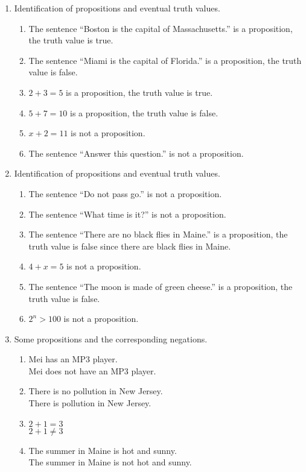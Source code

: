 \documentclass[fleqn]{article}
\begin{document}
\begin{enumerate}[label=\textbf{\arabic*}]

	\item Identification of propositions and eventual truth values.  
  \begin{enumerate}[label=\textbf{\alph*)}]
    \item The sentence ``Boston is the capital of Massachusetts.'' is a proposition, the truth value is true.
    \item The sentence ``Miami is the capital of Florida.'' is a proposition, the truth value is false.
    \item $ 2 + 3 = 5 $ is a proposition, the truth value is true.  
    \item $ 5 + 7 = 10 $ is a proposition, the truth value is false.
    \item $ x + 2 = 11 $ is not a proposition.
    \item The sentence ``Answer this question.'' is not a proposition. 
  \end{enumerate}

  \item Identification of propositions and eventual truth values.
  \begin{enumerate}[label=\textbf{\alph*)}]
    \item The sentence ``Do not pass go.'' is not a proposition.
    \item The sentence ``What time is it?'' is not a proposition.
    \item The sentence ``There are no black flies in Maine.'' is a proposition, the truth value is false since there are black flies in Maine.
    \item $ 4 + x = 5 $ is not a proposition.
    \item The sentence ``The moon is made of green cheese.'' is a proposition, the truth value is false.
    \item  $ 2^n > 100 $ is not a proposition.
  \end{enumerate}
  
  \item 
  Some propositions and the corresponding negations.
  \begin{enumerate}[label = \textbf{\alph*)}]
  \item 
  Mei has an MP3 player.\\
  Mei does not have an MP3 player.
  \item
  There is no pollution in New Jersey.\\
  There is pollution in New Jersey.
  \item
  $2 + 1 = 3$\\
  $2 + 1 \neq 3$
  \item
  The summer in Maine is hot and sunny.\\
  The summer in Maine is not hot and sunny.
  \end{enumerate}
  

\end{enumerate}
\end{document}
